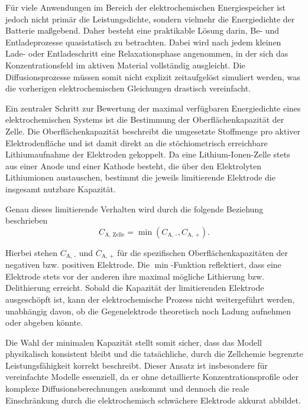 Für viele Anwendungen im Bereich der elektrochemischen Energiespeicher ist jedoch nicht primär die Leistungsdichte, sondern vielmehr die Energiedichte der Batterie maßgebend. Daher besteht eine praktikable Lösung darin, Be- und Entladeprozesse quasistatisch zu betrachten. Dabei wird nach jedem kleinen Lade- oder Entladeschritt eine Relaxationsphase angenommen, in der sich das Konzentrationsfeld im aktiven Material vollständig ausgleicht. Die Diffusionsprozesse müssen somit nicht explizit zeitaufgelöst simuliert werden, was die vorherigen elektrochemischen Gleichungen drastisch vereinfacht.

Ein zentraler Schritt zur Bewertung der maximal verfügbaren Energiedichte eines elektrochemischen Systems ist die Bestimmung der Oberflächenkapazität der Zelle. Die Oberflächenkapazität beschreibt die umgesetzte Stoffmenge pro aktiver Elektrodenfläche und ist damit direkt an die stöchiometrisch erreichbare Lithiumaufnahme der Elektroden gekoppelt. Da eine Lithium-Ionen-Zelle stets aus einer Anode und einer Kathode besteht, die über den Elektrolyten Lithiumionen austauschen, bestimmt die jeweils limitierende Elektrode die insgesamt nutzbare Kapazität. 

Genau dieses limitierende Verhalten wird durch die folgende Beziehung beschrieben
\begin{equation}
    \label{eq:capacity_limitation}
    C_{\text{A, Zelle}} = \min \left( C_{\text{A, -}} , C_{\text{A, +}}\right).
\end{equation}

Hierbei stehen $C_{\text{A, -}}$ und $C_{\text{A, +}}$ für die spezifischen Oberflächenkapazitäten der negativen  bzw. positiven  Elektrode. Die $\min$-Funktion reflektiert, dass eine Elektrode stets vor der anderen ihre maximal mögliche Lithierung bzw. Delithierung erreicht. Sobald die Kapazität der limitierenden Elektrode ausgeschöpft ist, kann der elektrochemische Prozess nicht weitergeführt werden, unabhängig davon, ob die Gegenelektrode theoretisch noch Ladung aufnehmen oder abgeben könnte. 

Die Wahl der minimalen Kapazität stellt somit sicher, dass das Modell physikalisch konsistent bleibt und die tatsächliche, durch die Zellchemie begrenzte Leistungsfähigkeit korrekt beschreibt. Dieser Ansatz ist insbesondere für vereinfachte Modelle essenziell, da er ohne detaillierte Konzentrationsprofile oder komplexe Diffusionsberechnungen auskommt und dennoch die reale Einschränkung durch die elektrochemisch schwächere Elektrode akkurat abbildet.

